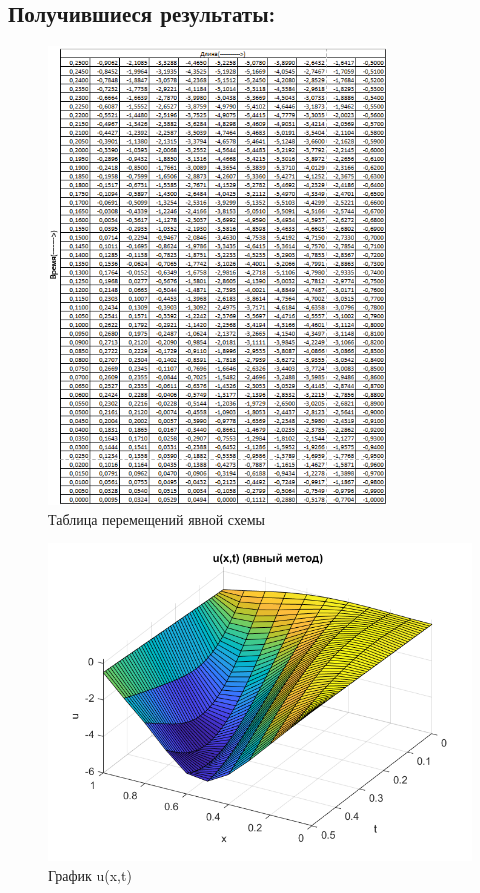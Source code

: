 \documentclass[]{article}
\begin{document}
		\subsection*{Получившиеся результаты:}
		\begin{figure}[H]
			\centering
			\includegraphics[width=0.8\textwidth]{tab1}
			\caption{Таблица перемещений явной схемы}
			\label{pиc1}
		\end{figure}
		\begin{figure}[H]
			\centering
			\includegraphics[width=\textwidth]{surfyavn}
			\caption{График u(x,t)}
			\label{pиc2}
		\end{figure}
\end{document}
